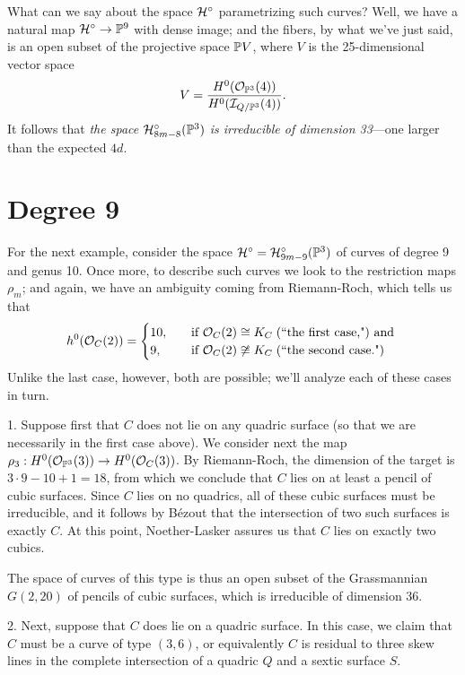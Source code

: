 What can we say about the space $\cH^\circ$ parametrizing such curves? Well, we have a natural map $\cH^\circ \to \PP^9$ with dense image; and the fibers, by what we've just said, is an open subset of the projective space $\PP V$, where $V$ is the 25-dimensional vector space
$$
V = \frac{H^0(\cO_{\PP^3}(4))}{H^0(\cI_{Q/\PP^3}(4))}.
$$
It follows that \emph{the space $\cH^\circ_{8m-8}(\PP^3)$ is irreducible of dimension 33}---one larger than the expected $4d$.


\section{Degree 9}

For the next example, consider the space $\cH^\circ = \cH^\circ_{9m-9}(\PP^3)$ of curves of degree 9 and genus 10. Once more, to describe such curves we look to the restriction maps $\rho_m$; and again, we have an ambiguity coming from Riemann-Roch, which tells us that
\begin{align*}
h^0(\cO_C(2)) =
\begin{cases}
10, \quad &\text{if } \cO_C(2) \cong K_C \; \text{(``the first case,") and } \\
9,  \quad &\text{if } \cO_C(2) \not\cong K_C  \; \text{(``the second case.")}
\end{cases}
\end{align*}
Unlike the last case, however, both are possible; we'll analyze each of these cases in turn.

1. Suppose first that $C$ does not lie on any quadric surface (so that we are necessarily in the first case above). We consider next the map $\rho_3 : H^0(\cO_{\PP^3}(3)) \to H^0(\cO_C(3))$. By Riemann-Roch, the dimension of the target is $3\cdot 9 - 10 + 1 = 18$, from which we conclude that $C$ lies on at least a pencil of cubic surfaces. Since $C$ lies on no quadrics, all of these cubic surfaces must be irreducible, and it follows by B\'ezout that the intersection of two such surfaces is exactly $C$. At this point, Noether-Lasker assures us that $C$ lies on exactly two cubics.

The space of curves of this type is thus an open subset of the Grassmannian $G(2,20)$ of pencils of cubic surfaces, which is irreducible of dimension 36.

2. Next, suppose that $C$ does lie on a quadric surface. In this case, we claim that $C$ must be a curve of type $(3,6)$, or equivalently $C$ is residual to three skew lines in the complete intersection of a quadric $Q$ and a sextic surface $S$.

